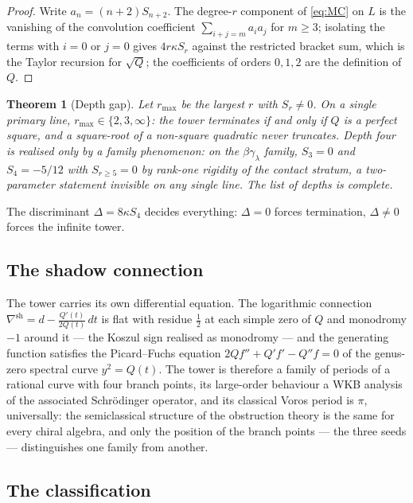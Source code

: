 \documentclass[11pt]{amsart}
\numberwithin{equation}{section}
\theoremstyle{plain}
\newtheorem{theorem}{Theorem}[section]
\theoremstyle{definition}
\theoremstyle{remark}
\begin{document}
\begin{proof}
Write $a_n=(n+2)S_{n+2}$. The degree-$r$ component of \eqref{eq:MC} on $L$
is the vanishing of the convolution coefficient
$\sum_{i+j=m}a_ia_j$ for $m\geq3$; isolating the terms with $i=0$ or
$j=0$ gives $4r\kappa S_r$ against the restricted bracket sum, which is
the Taylor recursion for $\sqrt{Q}$; the coefficients of orders
$0,1,2$ are the definition of $Q$.
\end{proof}

\begin{theorem}[Depth gap]\label{thm:depth-gap}
Let $r_{\max}$ be the largest $r$ with $S_r\neq0$. On a single primary
line, $r_{\max}\in\{2,3,\infty\}$: the tower terminates if and only if
$Q$ is a perfect square, and a square-root of a non-square quadratic never
truncates. Depth four is realised only by a family phenomenon: on the
$\beta\gamma_\lambda$ family, $S_3=0$ and $S_4=-5/12$ with $S_{r\geq5}=0$
by rank-one rigidity of the contact stratum, a two-parameter statement
invisible on any single line. The list of depths is complete.
\end{theorem}

The discriminant $\Delta=8\kappa S_4$ decides everything: $\Delta=0$
forces termination, $\Delta\neq0$ forces the infinite tower.

\subsection{The shadow connection}

The tower carries its own differential equation. The logarithmic
connection $\nabla^{\mathrm{sh}}=d-\frac{Q'(t)}{2Q(t)}\,dt$ is flat
with residue $\tfrac12$ at each simple zero of $Q$ and monodromy $-1$
around it --- the Koszul sign realised as monodromy --- and the
generating function satisfies the Picard--Fuchs equation
$2Qf''+Q'f'-Q''f=0$ of the genus-zero spectral curve $y^{2}=Q(t)$.
The tower is therefore a family of periods of a rational curve with
four branch points, its large-order behaviour a WKB analysis of the
associated Schr\"odinger operator, and its classical Voros period is
$\pi$, universally: the semiclassical structure of the obstruction
theory is the same for every chiral algebra, and only the position of
the branch points --- the three seeds --- distinguishes one family
from another.

\subsection{The classification}
\end{document}
